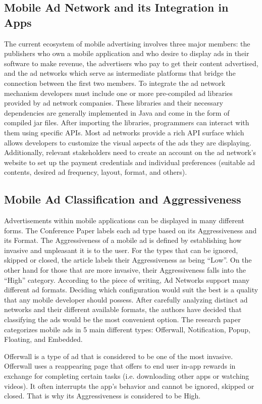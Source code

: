 \documentclass[conference]{IEEEtran}
\begin{document}
\subsection{Mobile Ad Network and its Integration in Apps}
The current ecosystem of mobile advertising involves three major members: the publishers who own a mobile application and who desire to display ads in their software to make revenue, the advertisers who pay to get their content advertised, and the ad networks which serve as intermediate platforms that bridge the connection between the first two members. To integrate the ad network mechanism developers must include one or more pre-compiled ad libraries provided by ad network companies. These libraries and their necessary dependencies are generally implemented in Java and come in the form of compiled jar files. After importing the libraries, programmers can interact with them using specific APIs. Most ad networks provide a rich API surface which allows developers to customize the visual aspects of the ads they are displaying. Additionally, relevant stakeholders need to create an account on the ad network’s website to set up the payment credentials and individual preferences (suitable ad contents, desired ad frequency, layout, format, and others). 

\subsection{Mobile Ad Classification and Aggressiveness}
Advertisements within mobile applications can be displayed in many different forms. The Conference Paper labels each ad type based on its Aggressiveness and its Format. The Aggressiveness of a mobile ad is defined by establishing how invasive and unpleasant it is to the user. For the types that can be ignored, skipped or closed, the article labels their Aggressiveness as being “Low”. On the other hand for those that are more invasive, their Aggressiveness falls into the “High” category. According to the piece of writing, Ad Networks support many different ad formats. Deciding which configuration would suit the best is a quality that any mobile developer should possess. After carefully analyzing distinct ad networks and their different available formats, the authors have decided that classifying the ads would be the most convenient option. The research paper categorizes mobile ads in 5 main different types: Offerwall, Notification, Popup, Floating, and Embedded.

Offerwall is a type of ad that is considered to be one of the most invasive. Offerwall uses a reappearing page that offers to end user in-app rewards in exchange for completing certain tasks (i.e. downloading other apps or watching videos). It often interrupts the app’s behavior and cannot be ignored, skipped or closed. That is why its Aggressiveness is considered to be High. 
\end{document}
